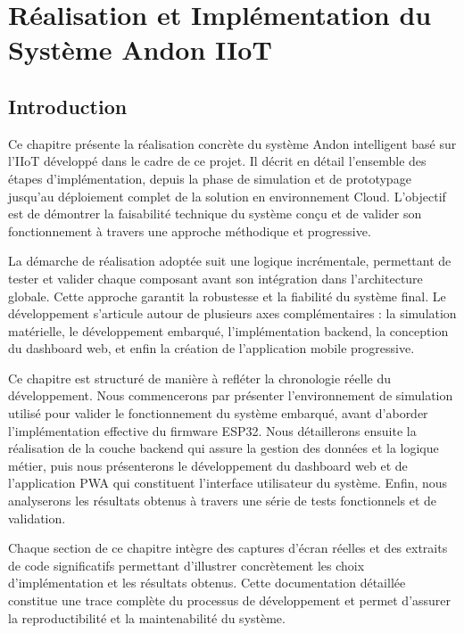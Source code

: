 ﻿%

\chapter{Réalisation et Implémentation du Système Andon IIoT}
\label{chap:implementation}

\section*{Introduction}

Ce chapitre présente la réalisation concrète du système Andon intelligent basé sur l'IIoT développé dans le cadre de ce projet. Il décrit en détail l'ensemble des étapes d'implémentation, depuis la phase de simulation et de prototypage jusqu'au déploiement complet de la solution en environnement Cloud. L'objectif est de démontrer la faisabilité technique du système conçu et de valider son fonctionnement à travers une approche méthodique et progressive.

La démarche de réalisation adoptée suit une logique incrémentale, permettant de tester et valider chaque composant avant son intégration dans l'architecture globale. Cette approche garantit la robustesse et la fiabilité du système final. Le développement s'articule autour de plusieurs axes complémentaires : la simulation matérielle, le développement embarqué, l'implémentation backend, la conception du dashboard web, et enfin la création de l'application mobile progressive.

Ce chapitre est structuré de manière à refléter la chronologie réelle du développement. Nous commencerons par présenter l'environnement de simulation utilisé pour valider le fonctionnement du système embarqué, avant d'aborder l'implémentation effective du firmware ESP32. Nous détaillerons ensuite la réalisation de la couche backend qui assure la gestion des données et la logique métier, puis nous présenterons le développement du dashboard web et de l'application PWA qui constituent l'interface utilisateur du système. Enfin, nous analyserons les résultats obtenus à travers une série de tests fonctionnels et de validation.

Chaque section de ce chapitre intègre des captures d'écran réelles et des extraits de code significatifs permettant d'illustrer concrètement les choix d'implémentation et les résultats obtenus. Cette documentation détaillée constitue une trace complète du processus de développement et permet d'assurer la reproductibilité et la maintenabilité du système.

